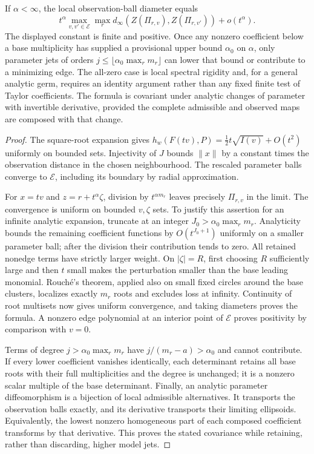 \begin{theorem}\label{thm:composed-jets-v94}
If $\alpha<\infty$, the local observation-ball diameter equals
\[
 t^\alpha\max_{v,v'\in\mathcal E}\max_r
       d_\infty(Z(\Pi_{r,v}),Z(\Pi_{r,v'}))+o(t^\alpha).
\]
The displayed constant is finite and positive. Once any nonzero
coefficient below a base multiplicity has supplied a provisional
upper bound $\alpha_0$ on $\alpha$, only parameter jets of orders
$j\le\lfloor\alpha_0\max_r m_r\rfloor$ can lower that bound or
contribute to a minimizing edge. The all-zero case is local spectral
rigidity and, for a general analytic germ, requires an identity
argument rather than any fixed finite test of Taylor coefficients.
The formula is covariant under analytic changes of parameter with
invertible derivative, provided the complete admissible and observed
maps are composed with that change.
\end{theorem}
\begin{proof}
The square-root expansion gives
$h_w(F(tv),P)=\tfrac12t\sqrt{I(v)}+O(t^2)$ uniformly on bounded
sets. Injectivity of $J$ bounds $\|x\|$ by a constant times the
observation distance in the chosen neighbourhood. The rescaled
parameter balls converge to $\mathcal E$, including its boundary
by radial approximation.

For $x=tv$ and $z=r+t^\alpha\zeta$, division by
$t^{\alpha m_r}$ leaves precisely $\Pi_{r,v}$ in the limit.
The convergence is uniform on bounded $v,\zeta$ sets. To justify
this assertion for an infinite analytic expansion, truncate at an
integer $J_0>\alpha_0\max_r m_r$. Analyticity bounds the remaining
coefficient functions by $O(t^{J_0+1})$ uniformly on a smaller
parameter ball; after the division their contribution tends to
zero. All retained nonedge terms have strictly larger weight.
On $|\zeta|=R$, first choosing $R$ sufficiently large and then
$t$ small makes the perturbation smaller than the base leading
monomial. Rouch\'e's theorem, applied also on small fixed circles
around the base clusters, localizes exactly $m_r$ roots and excludes
loss at infinity. Continuity of root multisets now gives uniform
convergence, and taking diameters proves the formula. A nonzero
edge polynomial at an interior point of $\mathcal E$ proves
positivity by comparison with $v=0$.

Terms of degree $j>\alpha_0\max_r m_r$ have
$j/(m_r-a)>\alpha_0$ and cannot contribute. If every lower
coefficient vanishes identically, each determinant retains all
base roots with their full multiplicities and the degree is
unchanged; it is a nonzero scalar multiple of the base determinant.
Finally, an analytic parameter diffeomorphism is a bijection of
local admissible alternatives. It transports the observation balls
exactly, and its derivative transports their limiting ellipsoids.
Equivalently, the lowest nonzero homogeneous part of each composed
coefficient transforms by that derivative. This proves the stated
covariance while retaining, rather than discarding, higher model jets.
\end{proof}

